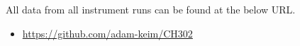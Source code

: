 \documentclass[journal=jacsat,manuscript=communication]{achemso}
\begin{document}
\begin{suppinfo}

All data from all instrument runs can be found at the below URL.
\begin{itemize}
  \item \url{https://github.com/adam-keim/CH302}
\end{itemize}

\end{suppinfo}


\end{document}
